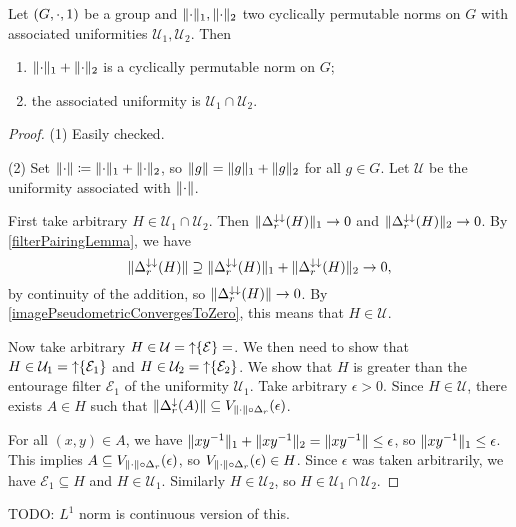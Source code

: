 \begin{proposition}
Let $\sSet{G,\cdot, 1}$ be a group and $\lVert\cdot\rVert_1, \lVert\cdot\rVert_2$ two cyclically permutable norms on $G$ with associated uniformities $\mathcal{U}_1, \mathcal{U}_2$. Then
\begin{enumerate}
\item $\lVert\cdot\rVert_1 + \lVert\cdot\rVert_2$ is a cyclically permutable norm on $G$;
\item the associated uniformity is $\mathcal{U}_1 \cap \mathcal{U}_2$.
\end{enumerate}
\end{proposition}
\begin{proof}
(1) Easily checked.

(2) Set $\lVert\cdot\rVert \coloneqq \lVert\cdot\rVert_1 + \lVert\cdot\rVert_2$, so $\lVert g\rVert = \lVert g\rVert_1 + \lVert g\rVert_2$ for all $g\in G$. Let $\mathcal{U}$ be the uniformity associated with $\lVert\cdot\rVert$.

First take arbitrary $H\in \mathcal{U}_1 \cap \mathcal{U}_2$. Then $\lVert\Delta_r^{\downarrow\downarrow}(H)\rVert_1 \to 0$ and $\lVert\Delta_r^{\downarrow\downarrow}(H)\rVert_2 \to 0$. By \ref{filterPairingLemma}, we have
\[ \lVert\Delta_r^{\downarrow\downarrow}(H)\rVert \supseteq \lVert\Delta_r^{\downarrow\downarrow}(H)\rVert_1 + \lVert\Delta_r^{\downarrow\downarrow}(H)\rVert_2 \to 0, \]
by continuity of the addition, so $\lVert\Delta_r^{\downarrow\downarrow}(H)\rVert \to 0$. By \ref{imagePseudometricConvergesToZero}, this means that $H \in \mathcal{U}$.

Now take arbitrary $H\in \mathcal{U} = \operatorname{\uparrow} \{\mathcal{E}\} = $. We then need to show that $H \in \mathcal{U}_1 = \operatorname{\uparrow} \{\mathcal{E}_1\}$ and $H \in \mathcal{U}_2 = \operatorname{\uparrow} \{\mathcal{E}_2\}$. We show that $H$ is greater than the entourage filter $\mathcal{E}_1$ of the uniformity $\mathcal{U}_1$. Take arbitrary $\epsilon > 0$. Since $H\in \mathcal{U}$, there exists $A\in H$ such that $\lVert\Delta_r^\downarrow(A)\rVert \subseteq V_{\lVert\cdot\rVert\circ \Delta_r}(\epsilon)$.

For all $(x,y)\in A$, we have $\lVert xy^{-1}\rVert_1 + \lVert xy^{-1}\rVert_2 = \lVert xy^{-1}\rVert \leq \epsilon$, so $\lVert xy^{-1}\rVert_1 \leq \epsilon$. This implies $A \subseteq V_{\lVert\cdot\rVert\circ \Delta_r}(\epsilon)$, so $V_{\lVert\cdot\rVert\circ \Delta_r}(\epsilon)\in H$. Since $\epsilon$ was taken arbitrarily, we have $\mathcal{E}_1 \subseteq H$ and $H \in \mathcal{U}_1$. Similarly $H \in \mathcal{U}_2$, so $H \in \mathcal{U}_1 \cap \mathcal{U}_2$.
\end{proof}

TODO: $L^1$ norm is continuous version of this.

